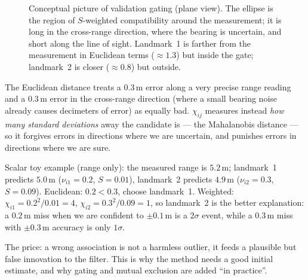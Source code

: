 \documentclass[11pt,a4paper]{article}
\def\bm#1{#1}%
\newcommand{\robot}[3][fill=white]{\begin{scope}[shift={(#2)},rotate=#3]\draw[#1,thick] (0.24,0)--(-0.16,0.15)--(-0.16,-0.15)--cycle;\end{scope}}
\theoremstyle{definition}
\theoremstyle{plain}
\theoremstyle{remark}
\begin{document}
\begin{figure}[H]
\centering
{}
\caption{Conceptual picture of validation gating (plane view). The ellipse is the region of $\bm S$-weighted compatibility around the measurement; it is long in the cross-range direction, where the bearing is uncertain, and short along the line of sight. Landmark~1 is farther from the measurement in Euclidean terms ($\approx1.3$) but inside the gate; landmark~2 is closer ($\approx0.8$) but outside.}
\label{fig:gating}
\end{figure}

\begin{intuition}
The Euclidean distance treats a $0.3$\,m error along a very precise range reading and a $0.3$\,m error in the cross-range direction (where a small bearing noise already causes decimeters of error) as equally bad. $\chi_{ij}$ measures instead \emph{how many standard deviations} away the candidate is --- the Mahalanobis distance --- so it forgives errors in directions where we are uncertain, and punishes errors in directions where we are sure.

Scalar toy example (range only): the measured range is $5.2$\,m; landmark~1 predicts $5.0$\,m ($\nu_{i1}=0.2$, $S=0.01$), landmark~2 predicts $4.9$\,m ($\nu_{i2}=0.3$, $S=0.09$). Euclidean: $0.2<0.3$, choose landmark~1. Weighted: $\chi_{i1}=0.2^2/0.01=4$, $\chi_{i2}=0.3^2/0.09=1$, so landmark~2 is the better explanation: a $0.2$\,m miss when we are confident to $\pm0.1$\,m is a $2\sigma$ event, while a $0.3$\,m miss with $\pm0.3$\,m accuracy is only $1\sigma$.

The price: a wrong association is not a harmless outlier, it feeds a plausible but false innovation to the filter. This is why the method needs a good initial estimate, and why gating and mutual exclusion are added ``in practice''.
\end{intuition}
\end{document}
